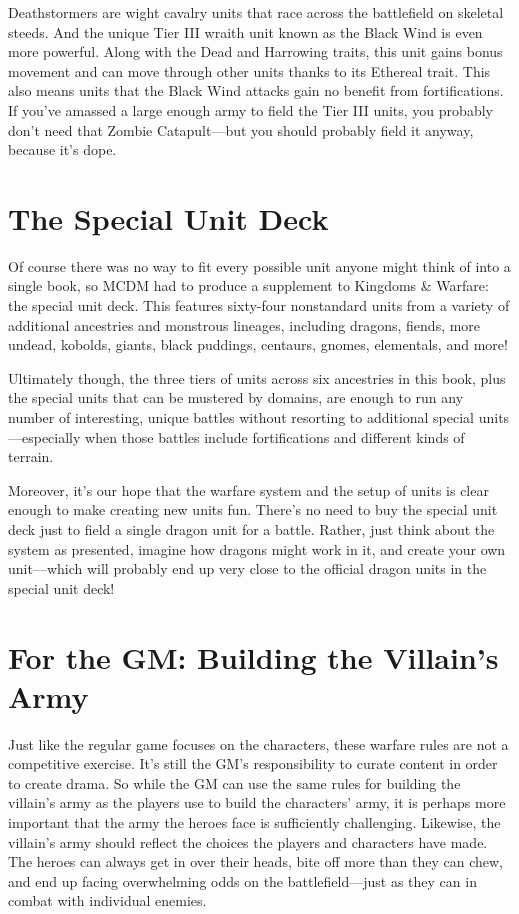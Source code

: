 \documentclass[10pt,a4paper,twoside,bg=print,twocolumn,openany,nodeprecatedcode]{dndbook}
\begin{document}
Deathstormers are wight cavalry units that race across the battlefield on skeletal steeds. And the unique Tier III wraith unit known as the Black Wind is even more powerful. Along with the Dead and Harrowing traits, this unit gains bonus movement and can move through other units thanks to its Ethereal trait. This also means units that the Black Wind attacks gain no benefit from fortifications. If you've amassed a large enough army to field the Tier III units, you probably don't need that Zombie Catapult—but you should probably field it anyway, because it's dope.

\section{The Special Unit Deck}
Of course there was no way to fit every possible unit anyone might think of into a single book, so MCDM had to produce a supplement to Kingdoms \& Warfare: the special unit deck. This features sixty-four nonstandard units from a variety of additional ancestries and monstrous lineages, including dragons, fiends, more undead, kobolds, giants, black puddings, centaurs, gnomes, elementals, and more!

Ultimately though, the three tiers of units across six ancestries in this book, plus the special units that can be mustered by domains, are enough to run any number of interesting, unique battles without resorting to additional special units—especially when those battles include fortifications and different kinds of terrain.

Moreover, it's our hope that the warfare system and the setup of units is clear enough to make creating new units fun. There's no need to buy the special unit deck just to field a single dragon unit for a battle. Rather, just think about the system as presented, imagine how dragons might work in it, and create your own unit—which will probably end up very close to the official dragon units in the special unit deck!

\section{For the GM: Building the Villain's Army}
Just like the regular game focuses on the characters, these warfare rules are not a competitive exercise. It's still the GM's responsibility to curate content in order to create drama. So while the GM can use the same rules for building the villain's army as the players use to build the characters' army, it is perhaps more important that the army the heroes face is sufficiently challenging. Likewise, the villain's army should reflect the choices the players and characters have made. The heroes can always get in over their heads, bite off more than they can chew, and end up facing overwhelming odds on the battlefield—just as they can in combat with individual enemies.
\end{document}
